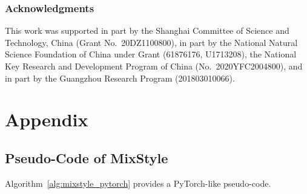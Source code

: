 \documentclass{article} \usepackage{iclr2021_conference,times}
\begin{document}
\subsubsection*{Acknowledgments}
This work was supported in part by the Shanghai Committee of Science and Technology, China (Grant No.~20DZ1100800), in part by the National Natural Science Foundation of China under Grant (61876176, U1713208), the National Key Research and Development Program of China (No.~2020YFC2004800), and in part by the Guangzhou Research Program (201803010066).






\clearpage
\appendix
\section{Appendix}


\subsection{Pseudo-Code of MixStyle} \label{appx:pseudo_code}
Algorithm~\ref{alg:mixstyle_pytorch} provides a PyTorch-like pseudo-code.
\end{document}
